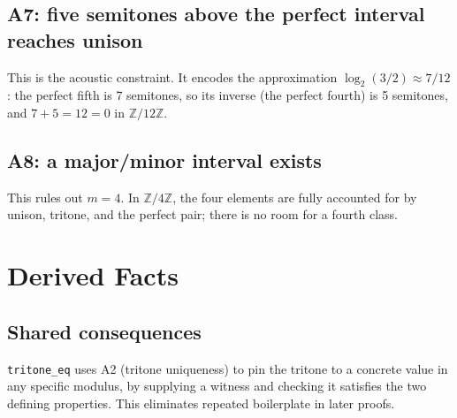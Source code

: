\documentclass{amsart}
\begin{document}


\subsection{A7: five semitones above the perfect interval reaches unison}

This is the acoustic constraint.  It encodes the approximation
$\log_2(3/2) \approx 7/12$: the perfect fifth is 7 semitones, so its
inverse (the perfect fourth) is 5 semitones, and $7 + 5 = 12 = 0$ in
$\mathbb{Z}/12\mathbb{Z}$.



\subsection{A8: a major/minor interval exists}

This rules out $m = 4$.  In $\mathbb{Z}/4\mathbb{Z}$, the four elements
are fully accounted for by unison, tritone, and the perfect pair; there
is no room for a fourth class.



\section{Derived Facts}
\label{sec:derived}

\subsection*{Shared consequences}

\texttt{tritone\_eq} uses A2 (tritone uniqueness) to pin the tritone to a
concrete value in any specific modulus, by supplying a witness and
checking it satisfies the two defining properties.  This eliminates
repeated boilerplate in later proofs.


\end{document}
